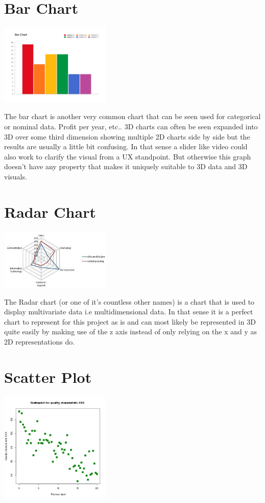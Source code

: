 \documentclass{report}
\begin{document}
\section{Bar Chart}
\begin{center}
    \includegraphics[width=150pt]{basic-bar-graph.png}
\end{center}

The bar chart is another very common chart that can be seen used for categorical or nominal data. Profit per year, etc..
3D charts can often be seen expanded into 3D over some third dimension showing multiple 2D charts side by side but the results are usually a little bit confusing. In that sense a slider like video could also work to clarify the visual from a UX standpoint. But otherwise this graph doesn't have any property that makes it uniquely suitable to 3D data and 3D visuals.

\section{Radar Chart}
\begin{center}
    \includegraphics[width=150pt]{Spider_Chart2.jpg}
\end{center}

The Radar chart (or one of it's countless other names) is a chart that is used to display multivariate data i.e multidimensional data. In that sense it is a perfect chart to represent for this project as is and can most likely be represented in 3D quite easily by making use of the z axis instead of only relying on the x and y as 2D representations do.

\section{Scatter Plot}
\begin{center}
    \includegraphics[width=150pt]{Scatter_diagram_for_quality_characteristic_XXX.svg.png}
\end{center}
\end{document}
